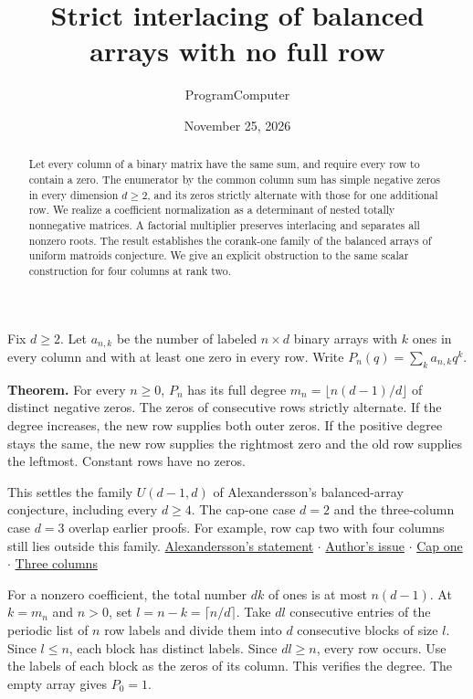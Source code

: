 \documentclass[11pt]{article}
\title{Strict interlacing of balanced arrays with no full row}
\author{ProgramComputer}
\date{November 25, 2026}
\begin{document}
\maketitle
\begin{abstract}
Let every column of a binary matrix have the same sum, and require every row to contain a zero. The enumerator by the common column sum has simple negative zeros in every dimension $d\ge2$, and its zeros strictly alternate with those for one additional row. We realize a coefficient normalization as a determinant of nested totally nonnegative matrices. A factorial multiplier preserves interlacing and separates all nonzero roots. The result establishes the corank-one family of the balanced arrays of uniform matroids conjecture. We give an explicit obstruction to the same scalar construction for four columns at rank two.
\end{abstract}
Fix $d\ge2$. Let $a_{n,k}$ be the number of labeled $n\times d$ binary arrays with $k$ ones in every column and with at least one zero in every row. Write $P_n(q)=\sum_k a_{n,k}q^k$.

\textbf{Theorem.} For every $n\ge0$, $P_n$ has its full degree $m_n=\lfloor n(d-1)/d\rfloor$ of distinct negative zeros. The zeros of consecutive rows strictly alternate. If the degree increases, the new row supplies both outer zeros. If the positive degree stays the same, the new row supplies the rightmost zero and the old row supplies the leftmost. Constant rows have no zeros.

This settles the family $U(d-1,d)$ of Alexandersson's balanced-array conjecture, including every $d\ge4$. The cap-one case $d=2$ and the three-column case $d=3$ overlap earlier proofs. For example, row cap two with four columns still lies outside this family. \href{https://www.symmetricfunctions.com/realRootedOpenProblems.htm\#conjBalancedArrays}{Alexandersson's statement} $\cdot$ \href{https://github.com/PerAlexandersson/RealRooted/issues/2005}{Author's issue} $\cdot$ \href{https://github.com/ProgramComputer/open-math-research/blob/main/topics/balanced-arrays/finite-linear-reduction.md}{Cap one} $\cdot$ \href{https://github.com/ProgramComputer/open-math-research/blob/main/topics/balanced-arrays/three-column-all-rows.md}{Three columns}

For a nonzero coefficient, the total number $dk$ of ones is at most $n(d-1)$. At $k=m_n$ and $n>0$, set $l=n-k=\lceil n/d\rceil$. Take $dl$ consecutive entries of the periodic list of $n$ row labels and divide them into $d$ consecutive blocks of size $l$. Since $l\le n$, each block has distinct labels. Since $dl\ge n$, every row occurs. Use the labels of each block as the zeros of its column. This verifies the degree. The empty array gives $P_0=1$.
\end{document}
